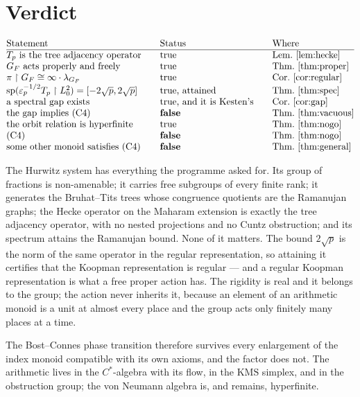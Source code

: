 \documentclass[11pt]{amsart}
\numberwithin{equation}{section}
\theoremstyle{definition}
\theoremstyle{remark}
\begin{document}
\section{Verdict}\label{sec:verdict}

\[
\begin{array}{@{}l@{\qquad}l@{\qquad}l@{}}
\text{Statement} & \text{Status} & \text{Where}\\\hline
T_p\ \text{is the tree adjacency operator} & \text{true} & \text{Lem.~\ref{lem:hecke}}\\
G_F\ \text{acts properly and freely} & \text{true} & \text{Thm.~\ref{thm:proper}}\\
\pi\restriction G_F\cong\infty\cdot\lambda_{G_F} & \text{true} & \text{Cor.~\ref{cor:regular}}\\
\mathrm{sp}(\varepsilon_p^{-1/2}T_p\restriction L^2_0)=[-2\sqrt p,2\sqrt p] & \text{true, attained} & \text{Thm.~\ref{thm:spec}}\\
\text{a spectral gap exists} & \text{true, and it is Kesten's} & \text{Cor.~\ref{cor:gap}}\\
\text{the gap implies (C4)} & \textbf{false} & \text{Thm.~\ref{thm:vacuous}}\\
\text{the orbit relation is hyperfinite} & \text{true} & \text{Thm.~\ref{thm:nogo}}\\
\text{(C4)} & \textbf{false} & \text{Thm.~\ref{thm:nogo}}\\
\text{some other monoid satisfies (C4)} & \textbf{false} & \text{Thm.~\ref{thm:general}}
\end{array}
\]

The Hurwitz system has everything the programme asked for. Its group of fractions is
non-amenable; it carries free subgroups of every finite rank; it generates the Bruhat--Tits trees
whose congruence quotients are the Ramanujan graphs; the Hecke operator on the Maharam extension
is exactly the tree adjacency operator, with no nested projections and no Cuntz obstruction; and
its spectrum attains the Ramanujan bound. None of it matters. The bound $2\sqrt p$ is the norm of
the same operator in the regular representation, so attaining it certifies that the Koopman
representation is regular --- and a regular Koopman representation is what a free proper action
has. The rigidity is real and it belongs to the group; the action never inherits it, because an
element of an arithmetic monoid is a unit at almost every place and the group acts only finitely
many places at a time.

The Bost--Connes phase transition therefore survives every enlargement of the index monoid
compatible with its own axioms, and the factor does not. The arithmetic lives in the
$C^*$-algebra with its flow, in the $\mathrm{KMS}$ simplex, and in the obstruction group; the von
Neumann algebra is, and remains, hyperfinite.
\end{document}
